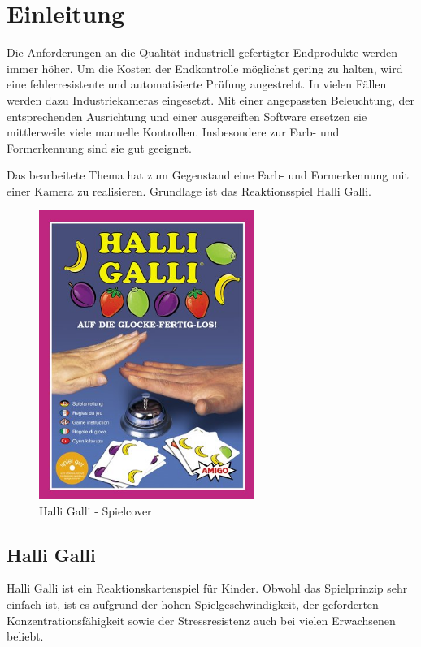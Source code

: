 
\section{Einleitung}
\label{sec:Einleitung}

Die Anforderungen an die Qualität industriell gefertigter Endprodukte werden immer höher. Um die Kosten der Endkontrolle möglichst gering zu halten, wird eine fehlerresistente und automatisierte Prüfung angestrebt. In vielen Fällen werden dazu Industriekameras eingesetzt. Mit einer angepassten Beleuchtung, der entsprechenden Ausrichtung und einer ausgereiften Software ersetzen sie mittlerweile viele manuelle Kontrollen. Insbesondere zur Farb- und Formerkennung sind sie gut geeignet.

Das bearbeitete Thema hat zum Gegenstand eine Farb- und Formerkennung mit einer Kamera zu realisieren. Grundlage ist das Reaktionsspiel Halli Galli. 

\begin{figure}[H]
    \centering
    \includegraphics[width=7cm]{Abbildungen/cover}
    \caption[Cocer]{Halli Galli - Spielcover}
    \label{fig:Cover}
\end{figure}

\subsection{Halli Galli}

Halli Galli ist ein Reaktionskartenspiel für Kinder. Obwohl das Spielprinzip sehr einfach ist, ist es aufgrund der hohen Spielgeschwindigkeit, der geforderten Konzentrationsfähigkeit sowie der Stressresistenz auch bei vielen Erwachsenen beliebt. 

